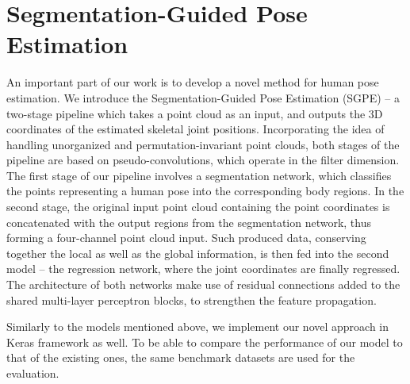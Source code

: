 \section{Segmentation-Guided Pose Estimation}

An important part of our work is to develop a novel method for human pose estimation. We introduce the Segmentation-Guided Pose Estimation (SGPE) – a two-stage pipeline which takes a point cloud as an input, and outputs the 3D coordinates of the estimated skeletal joint positions. Incorporating the idea of handling unorganized and permutation-invariant point clouds, both stages of the pipeline are based on pseudo-convolutions, which operate in the filter dimension. The first stage of our pipeline involves a segmentation network, which classifies the points representing a human pose into the corresponding body regions. In the second stage, the original input point cloud containing the point coordinates is concatenated with the output regions from the segmentation network, thus forming a four-channel point cloud input. Such produced data, conserving together the local as well as the global information, is then fed into the second model – the regression network, where the joint coordinates are finally regressed. The architecture of both networks make use of residual connections added to the shared multi-layer perceptron blocks, to strengthen the feature propagation.\par
\vspace{5mm}
\noindent Similarly to the models mentioned above, we implement our novel approach in Keras framework as well. To be able to compare the performance of our model to that of the existing ones, the same benchmark datasets are used for the evaluation.



